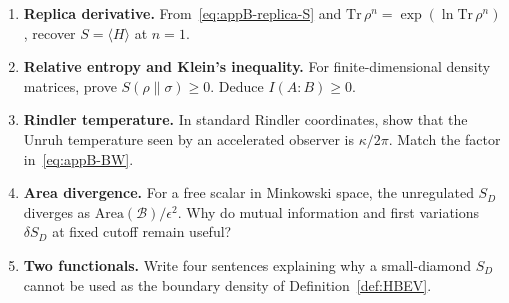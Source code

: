\begin{enumerate}
  \item \textbf{Replica derivative.}
    From~\eqref{eq:appB-replica-S} and
    \(\mathrm{Tr}\,\rho^n=\exp(\ln\mathrm{Tr}\,\rho^n)\), recover
    \(S=\langle H\rangle\) at \(n=1\).
  \item \textbf{Relative entropy and Klein's inequality.}
    For finite-dimensional density matrices, prove
    \(S(\rho\|\sigma)\ge 0\). Deduce \(I(A:B)\ge 0\).
  \item \textbf{Rindler temperature.}
    In standard Rindler coordinates, show that the Unruh
    temperature seen by an accelerated observer is
    \(\kappa/2\pi\). Match the factor in~\eqref{eq:appB-BW}.
  \item \textbf{Area divergence.}
    For a free scalar in Minkowski space, the unregulated
    \(S_D\) diverges as \(\mathrm{Area}(\mathcal{B})/\epsilon^2\).
    Why do mutual information and first variations \(\delta S_D\)
    at fixed cutoff remain useful?
  \item \textbf{Two functionals.}
    Write four sentences explaining why a small-diamond \(S_D\)
    cannot be used as the boundary density of Definition~\ref{def:HBEV}.
\end{enumerate}